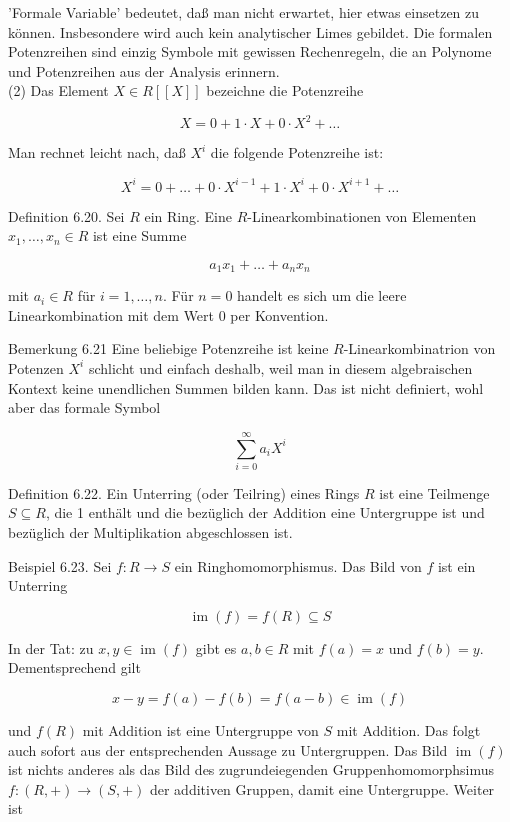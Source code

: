 \documentclass[10pt, letterpaper]{article}
\begin{document}
'Formale Variable' bedeutet, daß man nicht erwartet, hier etwas einsetzen zu können. Insbesondere wird auch kein analytischer Limes gebildet. Die formalen Potenzreihen sind einzig Symbole mit gewissen Rechenregeln, die an Polynome und Potenzreihen aus der Analysis erinnern.\\
(2) Das Element $X \in R[[X]]$ bezeichne die Potenzreihe

$$
X=0+1 \cdot X+0 \cdot X^{2}+\ldots
$$

Man rechnet leicht nach, daß $X^{i}$ die folgende Potenzreihe ist:

$$
X^{i}=0+\ldots+0 \cdot X^{i-1}+1 \cdot X^{i}+0 \cdot X^{i+1}+\ldots
$$

Definition 6.20. Sei $R$ ein Ring. Eine $R$-Linearkombinationen von Elementen $x_{1}, \ldots, x_{n} \in R$ ist eine Summe

$$
a_{1} x_{1}+\ldots+a_{n} x_{n}
$$

mit $a_{i} \in R$ für $i=1, \ldots, n$. Für $n=0$ handelt es sich um die leere Linearkombination mit dem Wert 0 per Konvention.

Bemerkung 6.21 Eine beliebige Potenzreihe ist keine $R$-Linearkombinatrion von Potenzen $X^{i}$ schlicht und einfach deshalb, weil man in diesem algebraischen Kontext keine unendlichen Summen bilden kann. Das ist nicht definiert, wohl aber das formale Symbol

$$
\sum_{i=0}^{\infty} a_{i} X^{i}
$$

Definition 6.22. Ein Unterring (oder Teilring) eines Rings $R$ ist eine Teilmenge $S \subseteq R$, die 1 enthält und die bezüglich der Addition eine Untergruppe ist und bezüglich der Multiplikation abgeschlossen ist.

Beispiel 6.23. Sei $f: R \rightarrow S$ ein Ringhomomorphismus. Das Bild von $f$ ist ein Unterring

$$
\operatorname{im}(f)=f(R) \subseteq S
$$

In der Tat: zu $x, y \in \operatorname{im}(f)$ gibt es $a, b \in R$ mit $f(a)=x$ und $f(b)=y$. Dementsprechend gilt

$$
x-y=f(a)-f(b)=f(a-b) \in \operatorname{im}(f)
$$

und $f(R)$ mit Addition ist eine Untergruppe von $S$ mit Addition. Das folgt auch sofort aus der entsprechenden Aussage zu Untergruppen. Das Bild $\operatorname{im}(f)$ ist nichts anderes als das Bild des zugrundeiegenden Gruppenhomomorphsimus $f:(R,+) \rightarrow(S,+)$ der additiven Gruppen, damit eine Untergruppe. Weiter ist
\end{document}
